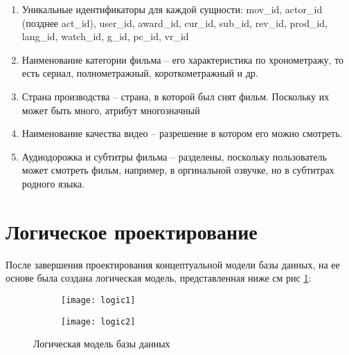 \begin{enumerate}
\item Уникальные идентификаторы для каждой сущности: mov\_id, actor\_id (позднее act\_id), user\_id, award\_id, 
cur\_id, sub\_id, rev\_id, prod\_id, lang\_id, watch\_id, g\_id, pc\_id, vr\_id
\item Наименование категории фильма -- его характеристика по хронометражу, то есть сериал, полнометражный, короткометражный и др.
\item Страна производства -- страна, в которой был снят фильм. Поскольку их может быть много, атрибут многозначный
\item Наименование качества видео -- разрешение в котором его можно смотреть.
\item Аудиодорожка и субтитры фильма -- разделены, поскольку пользователь может смотреть фильм, например, в оргинальной озвучке,
    но в субтитрах родного языка.
\end{enumerate}

\section{Логическое проектирование}
После завершения проектирования концептуальной модели базы данных, на ее основе была создана логическая модель, 
представленная ниже {см рис \ref{logic}}:

\begin{figure}
    \begin{subfigure}{.5\linewidth}
    \texttt{[image: logic1]}
    \end{subfigure}

    \begin{subfigure}{.5\linewidth}
    \texttt{[image: logic2]}
    \end{subfigure}

    \caption{Логическая модель базы данных}
    \label{logic}
\end{figure}





